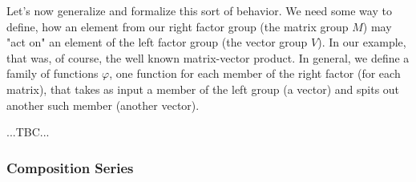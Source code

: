 \medskip
Let's now generalize and formalize this sort of behavior. We need some way to define, how an element from our right factor group (the matrix group $M$) may "act on" an element of the left factor group (the vector group $V$). In our example, that was, of course, the well known matrix-vector product. In general, we define a family of functions $\varphi$, one function for each member of the right factor (for each matrix), that takes as input a member of the left group (a vector) and spits out another such member (another vector). 

...TBC...









\subsubsection{Composition Series}




